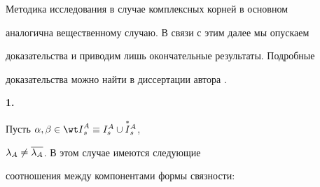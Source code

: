 Методика исследования в случае комплексных корней в основном


аналогична вещественному случаю. В связи с этим далее мы опускаем


доказательства и приводим лишь окончательные результаты. Подробные


доказательства можно найти в диссертации автора \cite{k-diss}.


\medskip





{\bf 1.}


Пусть $\alpha,\beta\in {\wt I}^A_s\equiv I^A_s \cup\overset{*}{I}{}^A_s$,


$\lambda_A \neq \overline{\lambda_A}$. В этом случае имеются следующие


соотношения между компонентами формы связности:


